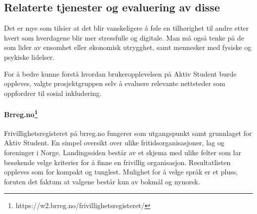\subsection{Relaterte tjenester og evaluering av disse}
\label{section:relaterte-tjenester}

Det er mye som tilsier at det blir vanskeligere å føle en tilhørighet til andre etter hvert som hverdagene blir mer stressfulle og digitale. Man må også tenke på de som lider av ensomhet eller økonomisk utrygghet, samt mennesker med fysiske og psykiske lidelser.


For å bedre kunne forstå hvordan brukeropplevelsen på Aktiv Student burde oppleves, valgte prosjektgruppen selv å evaluere relevante nettsteder som oppfordrer til sosial inkludering. 

\vspace{5mm} %

\paragraph{Brreg.no\footnote{https://w2.brreg.no/frivillighetsregisteret/}}
Frivillighetsregisteret på brreg.no fungerer som utgangspunkt samt grunnlaget for Aktiv Student. En simpel oversikt over ulike fritidsorganisasjoner, lag og foreninger i Norge. Landingssiden består av et skjema med ulike felter som lar besøkende velge kriterier for å finne en frivillig organisasjon. Resultatlisten oppleves som for kompakt og tunglest. Mulighet for å velge språk er et pluss, foruten det faktum at valgene består kun av bokmål og nynorsk.

\vspace{5mm} %

